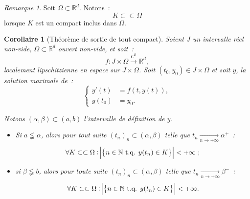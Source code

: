 \documentclass{report}
\newtheorem{cor}[thm]{Corollaire}
\theoremstyle{definition}
\theoremstyle{remark}
\newtheorem*{rmq}{Remarque}
\numberwithin{equation}{section}
\newcommand{\R}{\mathbb R}
\newcommand{\N}{\mathbb N}
\newcommand{\tq}{\text{ t.q. }}
\newcommand{\toC}[1]{\xrightarrow{C^{#1}}}
\newcommand{\pinfty}{{+\infty}}
\newcommand{\subscpct}{\subset\subset}
\begin{document}
			\begin{rmq} Soit $\Omega \subset \R^d$. Notons~:
			\begin{equation}
				K \subscpct \Omega
			\end{equation}
			lorsque $K$ est un compact inclus dans $\Omega$.
			\end{rmq}

			\begin{cor}[Théorème de sortie de tout compact] Soient $J$ un intervalle réel non-vide, $\Omega \subset \R^d$ ouvert non-vide, et soit~:
			\begin{equation}
				f : J \times \Omega \toC0 \R^d,
			\end{equation}
			localement lipschitzienne en espace sur $J \times \Omega$. Soit $(t_0, y_0) \in J \times \Omega$ et soit $y$, la solution maximale de~:
			\begin{equation}
				\begin{cases}
				y'(t) &= f(t, y(t)), \\
				y(t_0) &= y_0.
			\end{cases}
			\end{equation}

			Notons $(\alpha, \beta) \subset (a, b)$ l'intervalle de définition de $y$.

			\begin{itemize}
				\item Si $a \lneqq \alpha$, alors pour tout suite $(t_n)_n \subset (\alpha, \beta)$ telle que $t_n \xrightarrow[n \to \pinfty]{} \alpha^+$~:
				\begin{equation}
					\forall K \subscpct \Omega : \abs {\left\{n \in \N \tq y(t_n) \in K\right\}} < \pinfty~;
				\end{equation}
				\item si $\beta \lneqq b$, alors pour toute suite $(t_n)_n \subset (\alpha, \beta)$ telle que $t_n \xrightarrow[n \to \pinfty]{} \beta^-$~:
				\begin{equation}
					\forall K \subscpct \Omega : \abs {\left\{n \in \N \tq y(t_n) \in K\right\}} < \pinfty.
				\end{equation}
			\end{itemize}
			\end{cor}
\end{document}

